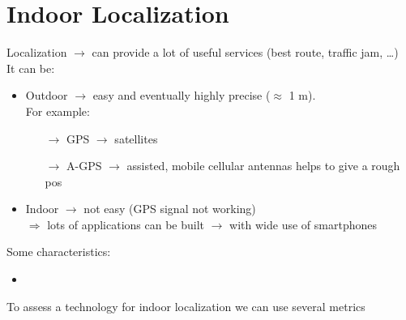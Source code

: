 \section{Indoor Localization}
Localization $\rightarrow$ can provide a lot of useful services (best route, traffic jam,
\dots)\\It can be:
\begin{itemize}
    \item Outdoor $\rightarrow$  easy and eventually highly precise ($\approx$ 1 m).\\
    For example:
    \begin{itemize}
        \item[$\rightarrow$] GPS $\rightarrow$ satellites
        \item[$\rightarrow$] A-GPS $\rightarrow$ assisted, mobile cellular antennas
        helps to give a rough pos
    \end{itemize}
    \item Indoor $\rightarrow$ not easy (GPS signal not working)\\
    $\Rightarrow$ lots of applications can be built $\rightarrow$ with wide use of smartphones
\end{itemize}
Some characteristics:
\begin{itemize}
    \item 
\end{itemize}
To assess a technology for indoor localization we can use several metrics